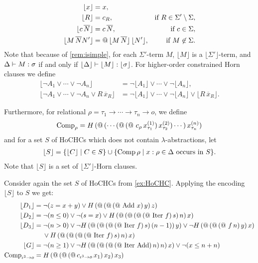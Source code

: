 \documentclass[a4paper,twoside,notitlepage,openright,11pt]{report}
\begin{document}
\begin{align*}
  \lfloor x\rfloor&=x,\\
  \lfloor R\rfloor&=c_R,&\text{if }R\in\Sigma'\setminus\Sigma,\\
  \lfloor c\,\overline N\rfloor&= c\,\overline N,&\text{if $c\in\Sigma$},\\
  \lfloor M\,\overline NN'\rfloor&=\operatorname{@}\,\lfloor M\,\overline N\rfloor\,\lfloor N'\rfloor,&\text{if $M\not\in\Sigma$}.
\end{align*}
Note that because of \cref{rem:isimple}, for each $\Sigma'$-term $M$, $\lfloor M\rfloor$ is a $\lfloor\Sigma'\rfloor$-term, and $\Delta\vdash M:\sigma$ if and only if $\lfloor\Delta\rfloor\vdash\lfloor M\rfloor:\lfloor\sigma\rfloor$.
For higher-order constrained Horn clauses we define
\begin{align*}
  \lfloor\neg A_1\lor\cdots\lor\neg A_n\rfloor&=\neg\lfloor A_1\rfloor\lor\cdots\lor\neg\lfloor A_n\rfloor,\\
  \lfloor\neg A_1\lor\cdots\lor\neg A_n\lor R\,\overline x_R\rfloor&=\neg\lfloor A_1\rfloor\lor\cdots\lor\neg\lfloor A_n\rfloor\lor\lfloor R\,\overline x_R\rfloor.
\end{align*}

Furthermore, for relational $\rho=\tau_1\to\cdots\to\tau_n\to o$, we define
 \begin{align*}
   \operatorname{Comp}_\rho=H\, (\operatorname{@}\, (\cdots(\operatorname{@}\,(\operatorname{@}\,c_\rho\,x_{\tau_1}^{(1)})\,x_{\tau_2}^{(2)})\cdots )\,x_{\tau_n}^{(n)})
 \end{align*}
 and for a set $S$ of HoCHCs which does not contain $\lambda$-abstractions, let
 \begin{align*}
   \lfloor S\rfloor=\{\lfloor C\rfloor\mid C\in S\}\cup\{\operatorname{Comp}\rho\mid x:\rho\in\Delta\text{ occurs in }S\}.
 \end{align*}
 Note that $\lfloor S\rfloor$ is a set of $\lfloor\Sigma'\rfloor$-Horn clauses.
 
 \begin{example}
   Consider again the set $S$ of HoCHCs from \cref{ex:HoCHC}. Applying the encoding $\lfloor S\rfloor$ to $S$ we get:
   \begin{align*}
     \lfloor D_1\rfloor&=\neg(z=x+y)\lor H\,(\operatorname{@}\, (\operatorname{@}\, (\operatorname{@}\,\operatorname{Add}\,x)\,y)\,z)\\
     \lfloor D_2\rfloor&=\neg(n\leq 0)\lor\neg(s=x)\lor H\,(\operatorname{@}\,(\operatorname{@}\, (\operatorname{@}\, (\operatorname{@}\,\operatorname{Iter}\,f)\,s)\,n)\,x)\\
     \lfloor D_3\rfloor&=\neg(n>0)\lor\neg H\,(\operatorname{@}\,(\operatorname{@}\, (\operatorname{@}\, (\operatorname{@}\,\operatorname{Iter}\,f)\,s)\,(n-1))\,y)\lor\neg H\,(\operatorname{@}\,(\operatorname{@}\,(\operatorname{@}\,f\,n)\,y)\,x)\\
     &\hspace{0.45cm}\lor H\,(\operatorname{@}\,(\operatorname{@}\, (\operatorname{@}\, (\operatorname{@}\,\operatorname{Iter}\,f)\,s)\,n)\,x)\\
     \lfloor G\rfloor&=\neg(n\geq 1)\lor\neg H\,(\operatorname{@}\,(\operatorname{@}\, (\operatorname{@}\, (\operatorname{@}\,\operatorname{Iter}\,\operatorname{Add})\,n)\,n)\,x)\lor\neg(x\leq n+n)\\
     \operatorname{Comp}_{\iota^3\to o}&=H\,(\operatorname{@}\,(\operatorname{@}\,(\operatorname{@} c_{\iota^3\to o}\, x_1)\,x_2)\,x_3)
   \end{align*}
 \end{example}
\end{document}
